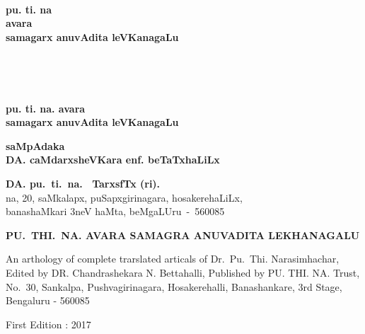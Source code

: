 
\thispagestyle{empty}
~\phantom{a}
\vfill

\begin{center}
{\Huge\bf pu. ti. na}\\[15pt]
{\Huge\bf avara}\\[15pt]
{\Huge\bf samagarx anuvAdita leVKanagaLu}
\end{center}

\vfill
\eject

\thispagestyle{empty}
~\phantom{a}
\vfill

\vfill
\eject

\thispagestyle{empty}
~\phantom{a}

\begin{center}
{\Huge\bf pu. ti. na. avara}\\[5pt]
{\Huge\bf samagarx anuvAdita leVKanagaLu}
\end{center}

\vfill

\begin{center}
{\bf saMpAdaka}\\[5pt]
{\Large\bf DA. caMdarxsheVKara enf. beTaTxhaLiLx}
\end{center}

\vfill

\begin{center}
{\large\bf DA. pu.~ti.~na.~ TarxsfTx (ri).}\\[2pt]
na, 20, saMkalapx, puSapxgirinagara, hosakerehaLiLx,\\[2pt]
banashaMkari 3neV haMta, beMgaLUru~-~560085
\end{center}

\eject

\thispagestyle{empty}

\noindent
{\eng\fontsize{8}{8pt}\selectfont\bfseries PU.~THI.~NA. AVARA SAMAGRA ANUVADITA LEKHANAGALU}
\bigskip

\noindent
{\eng\fontsize{10}{12}\selectfont An arthology of complete trarslated articals of Dr.~Pu.~Thi. Narasimhachar, Edited by DR. Chandrashekara N. Bettahalli, Published by PU. THI. NA. Trust, No.~30, Sankalpa, Pushvagirinagara, Hosakerehalli, Banashankare, 3rd Stage, Bengaluru - 560085}
\vskip 1.2cm

\noindent
{\eng\fontsize{10}{12}\selectfont First Edition : 2017}
\vskip 1.2cm

